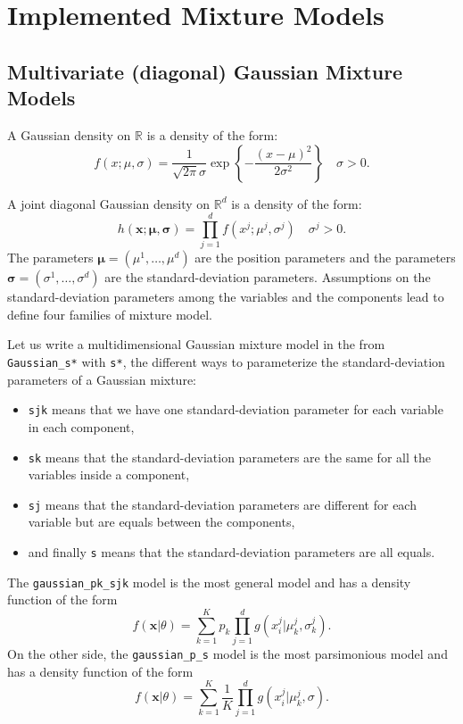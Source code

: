 \documentclass[shortnames,nojss,article]{jss}
\newcommand{\R}{\mathbb{R}}
\newcommand{\Rd}{{\mathbb{R}^d}}
\newcommand{\bx}{\mathbf{x}}
\newcommand{\bsigma}{\boldsymbol{\sigma}}
\newcommand{\bmu}{\boldsymbol{\mu}}
\begin{document}
\section{Implemented Mixture Models}
\label{sec:ImplementedModels}


\subsection{Multivariate (diagonal) Gaussian Mixture Models}
\label{subsec:DiagGaussian}
A Gaussian density on $\R$ is a density of the form:
\begin{equation}\label{law::gaussian-density}
f(x;\mu,\sigma) = \frac{1}{\sqrt{2\pi} \sigma} \exp\left\{- \frac{(x-\mu)^2}{2\sigma^2}\right\} \quad \sigma>0.
\end{equation}

A joint diagonal Gaussian density on $\Rd$ is a density of the form:
\begin{equation}\label{law::joint-gaussian-density}
h(\bx;\bmu,\bsigma) = \prod_{j=1}^d f(x^j;\mu^j,\sigma^j) \quad \sigma^j>0.
\end{equation}
The parameters $\bmu=(\mu^1,\ldots,\mu^d)$ are the position parameters and the
parameters $\bsigma=(\sigma^1,\ldots,\sigma^d)$ are the standard-deviation
parameters. Assumptions on the standard-deviation parameters among the variables
and the components lead to define four families of mixture model.

Let us write a multidimensional Gaussian mixture model in the from \verb+Gaussian_s*+
with \verb+s*+, the different ways to parameterize the standard-deviation
parameters of a Gaussian mixture:
\begin{itemize}
\item \verb+sjk+ means that we have one standard-deviation parameter for each
variable in each component,
\item \verb+sk+ means that the standard-deviation parameters are the same for
all the variables inside a component,
\item \verb+sj+ means that the standard-deviation parameters are different for
each variable but are equals between the components,
\item and finally \verb+s+ means that the standard-deviation parameters are all
equals.
\end{itemize}

The \verb+gaussian_pk_sjk+ model is the most general model and has a density
function of the form
\begin{equation}\label{eq:f_sjk}
  f({\bx}|\theta) = \sum_{k=1}^K p_k
  \prod_{j=1}^d g(x^j_{i}| \mu^j_{k}, \sigma^j_{k}).
\end{equation}
On the other side, the \verb+gaussian_p_s+ model is the most parsimonious model
and has a density function of the form
\begin{equation}\label{eq:f_s}
  f({\bx}|\theta) = \sum_{k=1}^K \frac{1}{K}
  \prod_{j=1}^d g(x^j_{i}| \mu^j_{k}, \sigma).
\end{equation}
\end{document}
